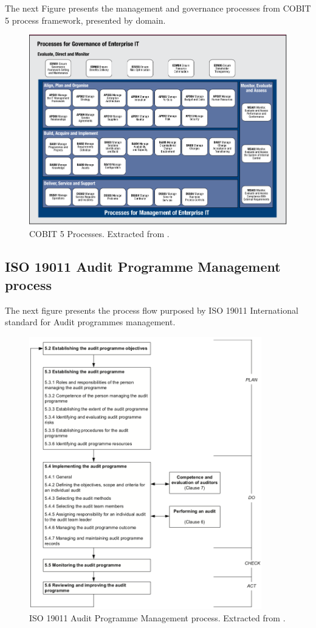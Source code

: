 The next Figure presents the management and governance processes from COBIT 5 process framework, presented by domain.

\begin{figure}[h!]
\centering
\includegraphics[width=\textwidth]{img/COBIT5ProcessFramework.png}
\caption{COBIT 5 Processes. Extracted from \cite{2012cobit}.}
\end{figure}

\newpage

\subsection{ISO 19011 Audit Programme Management process} 

The next figure presents the process flow purposed by ISO 19011 International standard for Audit programmes management.

\begin{figure}[h!]
\centering
\includegraphics[width=0.9\textwidth]{img/ISO19011AuditProcess.png}
\caption{ISO 19011 Audit Programme Management process. Extracted from \cite{ISO19011}.}
\end{figure}




